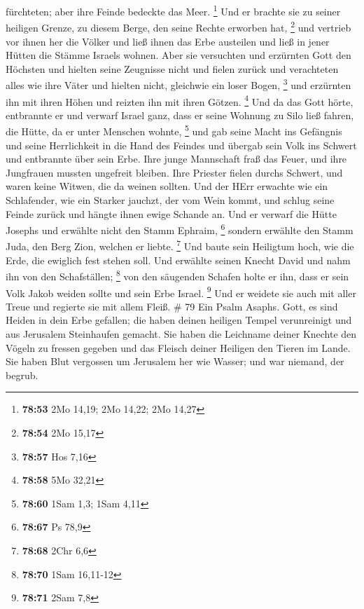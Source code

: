 fürchteten; aber ihre Feinde bedeckte das Meer. \footnote{\textbf{78:53}
  2Mo 14,19; 2Mo 14,22; 2Mo 14,27}  Und er brachte sie zu
seiner heiligen Grenze, zu diesem Berge, den seine Rechte erworben hat,
\footnote{\textbf{78:54} 2Mo 15,17}  und vertrieb vor ihnen
her die Völker und ließ ihnen das Erbe austeilen und ließ in jener
Hütten die Stämme Israels wohnen.  Aber sie versuchten und
erzürnten Gott den Höchsten und hielten seine Zeugnisse nicht
 und fielen zurück und verachteten alles wie ihre Väter und
hielten nicht, gleichwie ein loser Bogen, \footnote{\textbf{78:57} Hos
  7,16}  und erzürnten ihn mit ihren Höhen und reizten ihn
mit ihren Götzen. \footnote{\textbf{78:58} 5Mo 32,21}  Und
da das Gott hörte, entbrannte er und verwarf Israel ganz, 
dass er seine Wohnung zu Silo ließ fahren, die Hütte, da er unter
Menschen wohnte, \footnote{\textbf{78:60} 1Sam 1,3; 1Sam 4,11}
 und gab seine Macht ins Gefängnis und seine Herrlichkeit
in die Hand des Feindes  und übergab sein Volk ins Schwert
und entbrannte über sein Erbe.  Ihre junge Mannschaft fraß
das Feuer, und ihre Jungfrauen mussten ungefreit bleiben. 
Ihre Priester fielen durchs Schwert, und waren keine Witwen, die da
weinen sollten.  Und der HErr erwachte wie ein Schlafender,
wie ein Starker jauchzt, der vom Wein kommt,  und schlug
seine Feinde zurück und hängte ihnen ewige Schande an.  Und
er verwarf die Hütte Josephs und erwählte nicht den Stamm Ephraim,
\footnote{\textbf{78:67} Ps 78,9}  sondern erwählte den
Stamm Juda, den Berg Zion, welchen er liebte. \footnote{\textbf{78:68}
  2Chr 6,6}  Und baute sein Heiligtum hoch, wie die Erde,
die ewiglich fest stehen soll.  Und erwählte seinen Knecht
David und nahm ihn von den Schafställen; \footnote{\textbf{78:70} 1Sam
  16,11-12}  von den säugenden Schafen holte er ihn, dass
er sein Volk Jakob weiden sollte und sein Erbe Israel. \footnote{\textbf{78:71}
  2Sam 7,8}  Und er weidete sie auch mit aller Treue und
regierte sie mit allem Fleiß. \# 79  Ein Psalm Asaphs. Gott,
es sind Heiden in dein Erbe gefallen; die haben deinen heiligen Tempel
verunreinigt und aus Jerusalem Steinhaufen gemacht.  Sie
haben die Leichname deiner Knechte den Vögeln zu fressen gegeben und das
Fleisch deiner Heiligen den Tieren im Lande.  Sie haben Blut
vergossen um Jerusalem her wie Wasser; und war niemand, der begrub.
